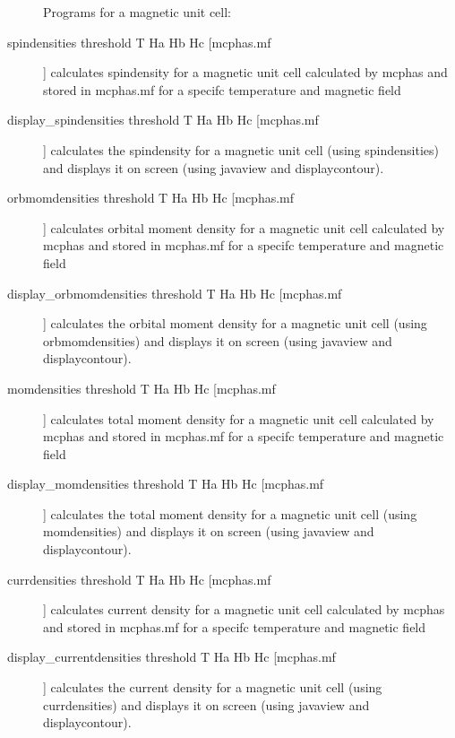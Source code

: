 \begin{description}
Programs for a magnetic unit cell:
\item [spindensities threshold T Ha Hb Hc [mcphas.mf]]
 calculates spindensity for a magnetic unit cell calculated by {\prg mcphas} and
 stored in {\prg mcphas.mf} for a specifc temperature and magnetic field
\item [display\_spindensities threshold T Ha Hb Hc [mcphas.mf]]
 calculates the spindensity for a magnetic unit cell (using {\prg spindensities})
 and displays it on screen (using {\prg javaview} and {\prg displaycontour}).
\item [orbmomdensities threshold T Ha Hb Hc [mcphas.mf]]
 calculates orbital moment density for a magnetic unit cell calculated by {\prg mcphas} and
 stored in {\prg mcphas.mf} for a specifc temperature and magnetic field
\item [display\_orbmomdensities threshold T Ha Hb Hc [mcphas.mf]]
 calculates the orbital moment 
density for a magnetic unit cell (using {\prg orbmomdensities})
 and displays it on screen (using {\prg javaview} and {\prg displaycontour}).
\item [momdensities threshold T Ha Hb Hc [mcphas.mf]]
 calculates total moment density for a magnetic unit 
cell calculated by {\prg mcphas} and
 stored in {\prg mcphas.mf} for a specifc temperature and magnetic field
\item [display\_momdensities threshold T Ha Hb Hc [mcphas.mf]]
 calculates the total moment density for a magnetic 
unit cell (using {\prg momdensities})
 and displays it on screen (using {\prg javaview} and {\prg displaycontour}).
\item [currdensities threshold T Ha Hb Hc [mcphas.mf]]
 calculates current density for a magnetic unit cell calculated by {\prg mcphas} and
 stored in {\prg mcphas.mf} for a specifc temperature and magnetic field
\item [display\_currentdensities threshold T Ha Hb Hc [mcphas.mf]]
 calculates the current 
density for a magnetic unit cell (using {\prg currdensities})
 and displays it on screen (using {\prg javaview} and {\prg displaycontour}).
\end{description}


